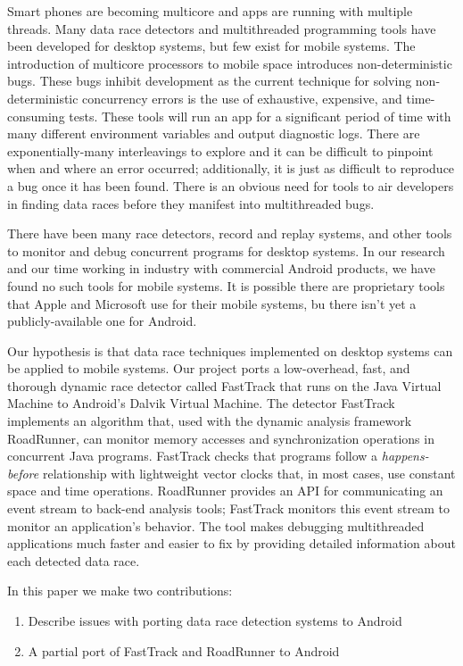 \documentclass{acm_proc_article-sp}
\begin{document}
Smart phones are becoming multicore and apps are running  with multiple threads. Many data race detectors and multithreaded programming tools have been developed for desktop systems, but few exist for mobile systems. The introduction of multicore processors to mobile space introduces non-deterministic bugs. These bugs inhibit development as the current technique for solving non-deterministic concurrency errors is the use of exhaustive, expensive, and time-consuming tests. These tools will run an app for a significant period of time with many different environment variables and output diagnostic logs. There are exponentially-many interleavings to explore and it can be difficult to pinpoint when and where an error occurred; additionally, it is just as difficult to reproduce a bug once it has been found. There is an obvious need for tools to air developers in finding data races before they manifest into multithreaded bugs.

There have been many race detectors, record and replay systems, and other tools to monitor and debug concurrent programs for desktop systems. In our research and our time working in industry with commercial Android products, we have found no such tools for mobile systems. It is possible there are proprietary tools that Apple and Microsoft use for their mobile systems, bu there isn't yet a publicly-available one for Android.
 
Our hypothesis is that data race techniques implemented on desktop systems can be applied to mobile systems. Our project ports a low-overhead, fast, and thorough dynamic race detector called FastTrack that runs on the Java Virtual Machine to Android's Dalvik Virtual Machine. The detector FastTrack \cite{Flanagan2009} implements an algorithm that, used with the dynamic analysis framework RoadRunner, can monitor memory accesses and synchronization operations in concurrent Java programs. FastTrack checks that programs follow a \emph{happens-before} relationship\cite{Flanagan2010} with lightweight vector clocks that, in most cases, use constant space and time operations. RoadRunner provides an API for communicating an event stream to back-end analysis tools; FastTrack monitors this event stream to monitor an application's behavior. The tool makes debugging multithreaded applications much faster and easier to fix by providing detailed information about each detected data race.
 
In this paper we make two contributions:
\begin{enumerate}
\item Describe issues with porting data race detection systems to Android
\item A partial port of FastTrack and RoadRunner to Android
\end{enumerate}
\end{document}
